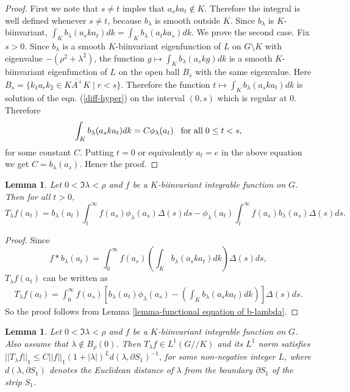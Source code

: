 \documentclass[11pt,reqno]{amsart}
\newtheorem{lemma}[theorem]{Lemma}
\theoremstyle{definition}
\theoremstyle{definition}
\numberwithin{equation}{section}
\begin{document}
\begin{proof}
First we note that $s\not=t$ imples that $a_ska_t\not \in K$.
Therefore the integral is well defined whenever $s\neq t$, because $b_\lambda$ is smooth outside $K$. Since $b_\lambda$ is $K$-biinvariant, $\int_K b_\lambda(a_ska_t)dk=\int_K b_\lambda(a_tka_s)dk$. We prove the second case. Fix $s>0$. Since $b_\lambda$ is a smooth $K$-biinvariant eigenfunction of $L$ on $G\setminus K$ with eigenvalue $-(\rho^2+\lambda^2)$, the function $g\mapsto\int_K b_\lambda(a_skg)dk$ is a smooth $K$-biinvariant eigenfunction of $L$ on the open ball $B_s$ with the same eigenvalue. Here $B_s=\{k_1a_r k_2\in K \overline{A^+} K\mid r<s\}$. Therefore the function $t\mapsto\int_Kb_\lambda(a_ska_t)dk$ is solution of the  eqn. (\ref{diff-hyper}) on the interval $(0,s)$ which is regular at $0$. Therefore 
$$
\int_Kb_\lambda(a_ska_t)dk=C\phi_\lambda(a_t)\hspace
{3mm}\textup{for all}\hspace{1mm} 0\leq t<s,
$$
for some constant $C$. Putting $t=0$ or equivalently $a_t=e$ in the above equation we get $C=b_\lambda(a_s)$. Hence the proof.
\end{proof}

\begin{lemma}\label{lemma-another formula of T-lambda-f}
Let $0<\Im\lambda<\rho$ and $f$ be a $K$-biinvariant integrable function on $G$. Then for all $t>0$,
$$
T_\lambda f(a_t)=b_\lambda(a_t)\int_t^\infty f(a_s)\phi_\lambda(a_s)\Delta(s)ds-\phi_\lambda(a_t)
\int_t^\infty f(a_s)b_\lambda(a_s)\Delta(s)ds.
$$
\end{lemma}
\begin{proof}
Since 
$$
f*b_\lambda(a_t)=\int_0^\infty f(a_s)\left(\int_K b_\lambda(a_ska_t)dk\right)\Delta(s)ds,
$$
$T_\lambda f(a_t)$ can be written as
\begin{eqnarray*}
T_\lambda f(a_t)=\int_0^\infty f(a_s)\left[b_\lambda(a_t)\phi_\lambda(a_s)-\left(\int_K b_\lambda(a_ska_t)dk\right)\right]\Delta(s)ds.
\end{eqnarray*}
So the proof follows from Lemma \ref{lemma-functional equation of b-lambda}.
\end{proof}

\begin{lemma}\label{L-1 norm of T-lambda-f}
Let $0<\Im\lambda<\rho$ and $f$ be a $K$-biinvariant integrable function on $G$. Also assume that $\lambda\notin B_\rho(0)$. Then 
$T_\lambda f\in L^1(G//K)$ and its $L^1$ norm satisfies $||T_\lambda f||_1\leq C||f||_1(1+|\lambda|)^Ld(\lambda,\partial S_1)^{-1}$, for some non-negative integer $L$, where $d(\lambda,\partial S_1)$ denotes the Euclidean distance of $\lambda$
from the boundary $\partial S_1$ of the strip $ S_1$. 
\end{lemma}
\end{document}
